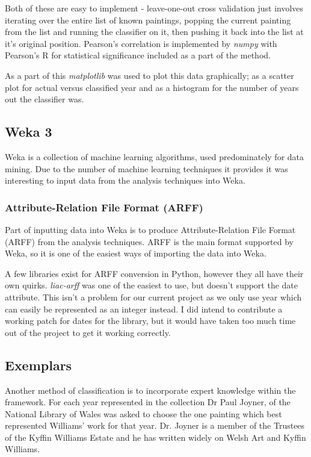 Both of these are easy to implement - leave-one-out cross validation just involves iterating over
the entire list of known paintings, popping the current painting from the list and running the 
classifier on it, then pushing it back into the list at it's original position. Pearson's 
correlation is implemented by \emph{numpy} with Pearson's R for statistical significance included
as a part of the method.

As a part of this \emph{matplotlib} was used to plot this data graphically; as a scatter plot for
actual versus classified year and as a histogram for the number of years out the classifier was.



\subsection{Weka 3}
Weka is a collection of machine learning algorithms\cite{Hall2009WEKA}, used predominately for
data mining. Due to the number of machine learning techniques it provides it was interesting to
input data from the analysis techniques into Weka.



\subsubsection{Attribute-Relation File Format (ARFF)}
Part of inputting data into Weka is to produce Attribute-Relation File Format (ARFF) from the
analysis techniques. ARFF is the main format supported by Weka, so it is one of the easiest ways
of importing the data into Weka.

A few libraries exist for ARFF conversion in Python, however they all have their own quirks. 
\emph{liac-arff} was one of the easiest to use, but doesn't support the date attribute. This isn't
a problem for our current project as we only use year which can easily be represented as an 
integer instead. I did intend to contribute a working patch for dates for the library, but it 
would have taken too much time out of the project to get it working correctly.


\subsection{Exemplars}
Another method of classification is to incorporate expert knowledge within the framework. For each
year represented in the collection Dr Paul Joyner, of the National Library of Wales was asked to
choose the one painting which best represented Williams' work for that year. Dr. Joyner is a 
member of the Trustees of the Kyffin Williams Estate and he has written widely on Welsh Art and
Kyffin Williams.

